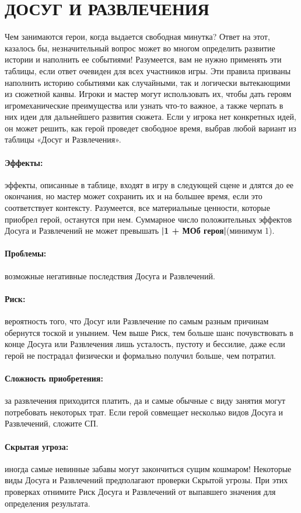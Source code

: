 \section{ДОСУГ И РАЗВЛЕЧЕНИЯ}
Чем занимаются герои, когда выдается свободная минутка? Ответ на этот, казалось бы, незначительный вопрос может во многом определить развитие истории и наполнить ее событиями! Разумеется, вам не нужно применять эти таблицы, если ответ очевиден для всех участников игры. Эти правила призваны наполнить историю событиями как случайными, так и логически вытекающими из сюжетной канвы. Игроки и мастер могут использовать их, чтобы дать героям игромеханические преимущества или узнать что-то важное, а также черпать в них идеи для дальнейшего развития сюжета. Если у игрока нет конкретных идей, он может решить, как герой проведет свободное время, выбрав любой вариант из таблицы «Досуг и Развлечения».
\paragraph{Эффекты:} эффекты, описанные в таблице, входят в игру в следующей сцене и длятся до ее окончания, но мастер может сохранить их и на большее время, если это соответствует контексту. Разумеется, все материальные ценности, которые приобрел герой, останутся при нем. Суммарное число положительных эффектов Досуга и Развлечений не может превышать \textbf{|1 + МОб героя|}(минимум 1).
\paragraph{Проблемы:} возможные негативные последствия Досуга и Развлечений.
\paragraph{Риск:} вероятность того, что Досуг или Развлечение по самым разным причинам обернутся тоской и унынием. Чем выше Риск, тем больше шанс почувствовать в конце Досуга или Развлечения лишь усталость, пустоту и бессилие, даже если герой не пострадал физически и формально получил больше, чем потратил.
\paragraph{Сложность приобретения:} за развлечения приходится платить, да и самые обычные с виду занятия могут потребовать некоторых трат. Если герой совмещает несколько видов Досуга и Развлечений, сложите СП.
\paragraph{Скрытая угроза:} иногда самые невинные забавы могут закончиться сущим кошмаром! Некоторые виды Досуга и Развлечений предполагают проверки Скрытой угрозы. При этих проверках отнимите Риск Досуга и Развлечений от выпавшего значения для определения результата.
